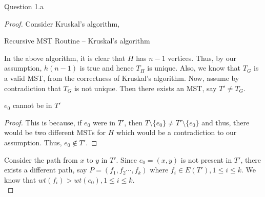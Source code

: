 \begin{solution}{Question 1.a}
\begin{proof}
        Consider Kruskal's algorithm,
        \begin{algorithm}[H]
            \caption{Recursive MST Routine -- Kruskal's algorithm} %
            \begin{algorithmic}[1]
                        \Else{}
                        \EndIf{}
                    \EndFor{}
                        \Else{}
                        \EndIf{}
                    \EndFor{}
                \EndProcedure{}
            \end{algorithmic}
        \end{algorithm}
        In the above algorithm, it is clear that $H$ has $n-1$ vertices. Thus, by our assumption, $h(n-1)$ is true and hence $T_H$ is unique. Also, we know that $T_G$ is a valid MST, from the correctness of Kruskal's algorithm. Now, assume by contradiction that $T_G$ is not unique. Then there exists an MST, say $T'\neq T_G$.
        \begin{claim}[]
            $e_0$ cannot be in $T'$
        \end{claim}
        \begin{proof}
            This is because, if $e_0$ were in $T'$, then $T\setminus\{e_0\}\neq T'\setminus\{e_0\}$ and thus, there would be two different MSTs for $H$ which would be a contradiction to our assumption. Thus, $e_0\notin T'$.
        \end{proof}
        Consider the path from $x$ to $y$ in $T'$. Since $e_0=(x, y)$ is not present in $T'$, there exists a different path, say $P=(f_1,f_2\cdots,f_k)$ where $f_i\in E(T'), 1\leq i \leq k$. We know that $wt(f_i) > wt(e_0), 1 \leq i \leq k$.\\

\end{proof}
\end{solution}
